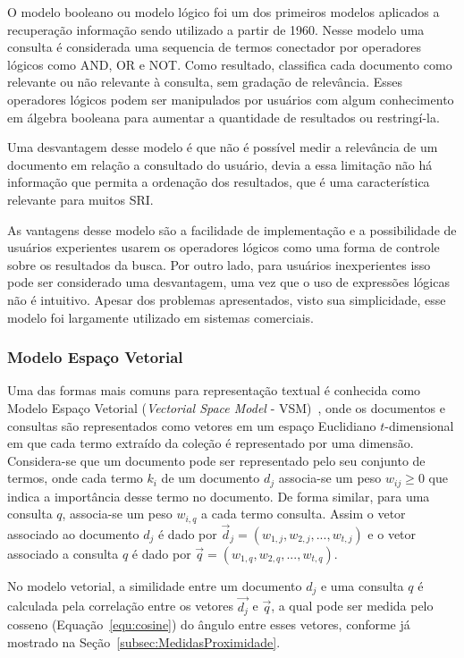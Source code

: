 O modelo booleano ou modelo lógico foi um dos primeiros modelos aplicados a recuperação informação sendo utilizado a partir de 1960. Nesse modelo uma consulta é considerada uma sequencia de termos conectador por operadores lógicos como AND, OR e NOT. Como resultado, classifica cada documento como relevante ou não relevante à consulta, sem gradação de relevância. Esses operadores lógicos podem ser manipulados por usuários com algum conhecimento em álgebra booleana para aumentar a quantidade de resultados ou restringí-la.

Uma desvantagem desse modelo é que não é possível medir a relevância de um documento em relação a consultado do usuário, devia a essa limitação não há informação que permita a ordenação dos resultados, que é uma característica relevante para muitos SRI.

As vantagens desse modelo são a facilidade de implementação e a possibilidade de usuários experientes usarem os operadores lógicos como uma forma de controle sobre os resultados da busca. Por outro lado, para usuários inexperientes isso pode ser considerado uma desvantagem, uma vez que o uso de expressões lógicas não é intuitivo. Apesar dos problemas apresentados, visto sua simplicidade, esse modelo foi largamente utilizado em sistemas comerciais. 



\subsubsection{Modelo Espaço Vetorial}
\label{subsec:modeloespacovetorial}

Uma das formas mais comuns para representação textual é conhecida como Modelo Espaço Vetorial (\textit{Vectorial Space Model} - VSM)~\cite{Rezende2003}, onde os documentos e consultas são representados como vetores em um espaço Euclidiano $t$-dimensional em que cada termo extraído da coleção é representado por uma dimensão. 
% 
Considera-se que um documento pode ser representado pelo seu conjunto de termos, onde cada termo $k_i$ de um documento $d_j$ associa-se um peso $w_{ij}\geq0$ que indica a importância desse termo no documento. 
%
De forma similar, para uma consulta $q$, associa-se um peso $w_{i,q}$ a cada termo consulta. 
%
Assim o vetor associado ao documento $d_j$ é dado por $\vec{d}_{j} = (w_{1,j}, w_{2,j}, ..., w_{t,j})$ 
%
e o vetor associado a consulta $q$ é dado por $\vec{q} = (w_{1,q}, w_{2,q}, ..., w_{t,q})$.

No modelo vetorial, a similidade entre um documento $d_j$ e uma consulta $q$ é calculada pela correlação entre os vetores $\vec{d_j}$ e $\vec{q}$, a qual pode ser medida pelo cosseno (Equação~\ref{equ:cosine}) do ângulo entre esses vetores, conforme já mostrado na Seção~\ref{subsec:MedidasProximidade}. 



